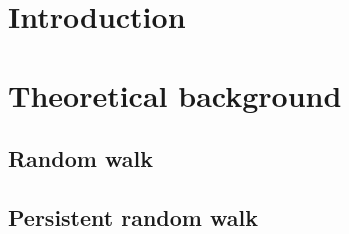 \documentclass{thesis}
\begin{document}
\chapter{Introduction}\label{chap:introduction}
\lipsum[1-20]

\chapter{Theoretical background}\label{chap:theoreticalBackground}
\lipsum[1-20]

\section{Random walk}\label{sec:randomWalk}
\lipsum[1-20]

\section{Persistent random walk}\label{sec:persistentRandomWalk}
\lipsum[1-20]

 
\end{document}
